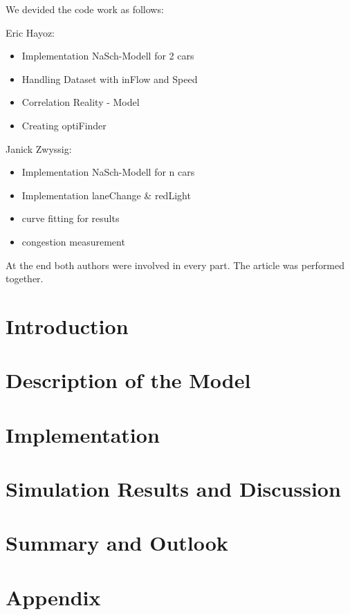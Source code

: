 \documentclass[11pt]{article}
\begin{document}
We devided the code work as follows:

Eric Hayoz:
\begin{itemize}
\item Implementation NaSch-Modell for 2 cars 
\item Handling Dataset with inFlow and Speed 
\item Correlation Reality - Model
\item Creating optiFinder 
\end{itemize}

Janick Zwyssig:
\begin{itemize}
\item Implementation NaSch-Modell for n cars
\item Implementation laneChange \& redLight
\item curve fitting for results
\item congestion measurement
\end{itemize}

At the end both authors were involved in every part. The article was performed together.

\section{Introduction}



\section{Description of the Model}




\section{Implementation}






\section{Simulation Results and Discussion}



\section{Summary and Outlook}



\section{Appendix}



\end{document}
